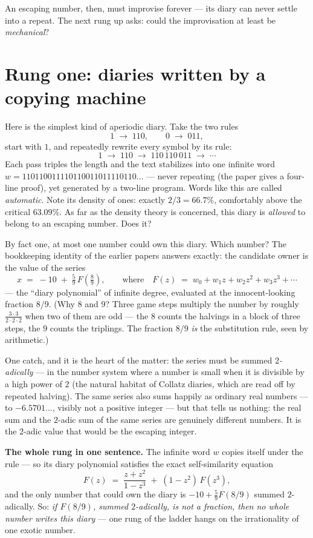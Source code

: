 \documentclass[11pt]{article}
\begin{document}
An escaping number, then, must improvise forever --- its diary can
never settle into a repeat. The next rung up asks: could the
improvisation at least be \emph{mechanical}?

\section{Rung one: diaries written by a copying machine}

Here is the simplest kind of aperiodic diary. Take the two rules
\[
1 \;\to\; 110, \qquad 0 \;\to\; 011,
\]
start with $1$, and repeatedly rewrite every symbol by its rule:
\[
1 \;\to\; 110 \;\to\; 110\,110\,011 \;\to\; \cdots
\]
Each pass triples the length and the text stabilizes into one
infinite word $w = 110110011110110011011110110\ldots$ --- never
repeating (the paper gives a four-line proof), yet generated by a
two-line program. Words like this are called \emph{automatic}. Note
its density of ones: exactly $2/3 = 66.7\%$, comfortably above the
critical $63.09\%$. As far as the density theory is concerned, this
diary is \emph{allowed} to belong to an escaping number. Does it?

By fact one, at most one number could own this diary. Which number?
The bookkeeping identity of the earlier papers answers exactly: the
candidate owner is the value of the series
\[
x \;=\; -10 \;+\; \tfrac{5}{9}\,F\!\left(\tfrac{8}{9}\right),
\qquad\text{where}\quad
F(z) \;=\; w_0 + w_1 z + w_2 z^2 + w_3 z^3 + \cdots
\]
--- the ``diary polynomial'' of infinite degree, evaluated at the
innocent-looking fraction $8/9$. (Why $8$ and $9$? Three game steps
multiply the number by roughly $\tfrac{3 \cdot 3}{2\cdot 2\cdot 2}$
when two of them are odd --- the $8$ counts the halvings in a block
of three steps, the $9$ counts the triplings. The fraction $8/9$
\emph{is} the substitution rule, seen by arithmetic.)

One catch, and it is the heart of the matter: the series must be
summed \emph{$2$-adically} --- in the number system where a number is
small when it is divisible by a high power of $2$ (the natural habitat
of Collatz diaries, which are read off by repeated halving). The same
series also sums happily as ordinary real numbers --- to
$-6.5701\ldots$, visibly not a positive integer --- but that tells us
nothing: the real sum and the $2$-adic sum of the same series are
genuinely different numbers. It is the $2$-adic value that would be
the escaping integer.

\begin{keyidea}
\textbf{The whole rung in one sentence.} The infinite word $w$ copies
itself under the rule --- so its diary polynomial satisfies the exact
self-similarity equation
\[
F(z) \;=\; \frac{z+z^2}{1-z^3} \;+\; (1-z^2)\,F(z^3),
\]
and the only number that could own the diary is
$-10 + \frac59 F(8/9)$ summed $2$-adically. So: \emph{if $F(8/9)$,
summed $2$-adically, is not a fraction, then no whole number writes
this diary} --- one rung of the ladder hangs on the irrationality of
one exotic number.
\end{keyidea}
\end{document}
